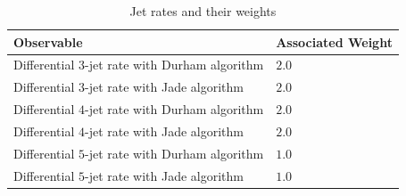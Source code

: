 \documentclass[aps,preprint,floatfix,nofootinbib,showpacs]{revtex4-1}
\begin{document}
   \begin{table}[tbp]
  \begin{center}
   \begin{tabular}{l|l}
    \hline 
    \hline
    Observable  \hspace{3cm} &  \hspace{1cm} Associated Weight \\ \hline
    Differential $3$-jet rate with Durham algorithm & \hspace{3cm} $2.0$ \\ \hline
    Differential $3$-jet rate with Jade algorithm & \hspace{3cm} $2.0$ \\ \hline
    Differential $4$-jet rate with Durham algorithm &\hspace{3cm} $2.0$ \\ \hline
    Differential $4$-jet rate with Jade algorithm &\hspace{3cm} $2.0$ \\ \hline
    Differential $5$-jet rate with Durham algorithm & \hspace{3cm} $1.0$ \\ \hline
    Differential $5$-jet rate with Jade algorithm & \hspace{3cm} $1.0$ \\ \hline \hline
   \end{tabular}
  \end{center}
  \caption{Jet rates and their weights}
  \label{Tab3}
 \end{table}
 
\end{document}
